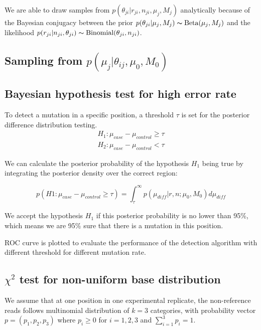 \documentclass[11pt,reqno]{amsart}
\begin{document}
We are able to draw samples from $p(\theta_{ji} | r_{ji}, n_{ji}, \mu_j, M_j)$ analytically because of the Bayesian conjugacy between the prior $p(\theta_{ji} | \mu_j, M_j) \thicksim \text{Beta}(\mu_j, M_j)$ and the likelihood $p(r_{ji} | n_{ji}, \theta_{ji}) \thicksim \text{Binomial}(\theta_{ji}, n_{ji})$. 


\subsection{Sampling from $p \left( \mu_j |\theta_{ij},\mu_0,M_0\right)$}

\subsection{Bayesian hypothesis test for high error rate}

To detect a mutation in a specific position, a threshold $\tau$ is set for the posterior difference distribution testing.
\begin{align}
 H_1: \mu_{case}-\mu_{control}\geq\tau \\
 H_2: \mu_{case}-\mu_{control}<\tau
\end{align}

We can calculate the posterior probability of the hypothesis $H_1$ being true by integrating the posterior density over the correct region:

\begin{equation}
 p(H1:\mu_{case}-\mu_{control}\geq\tau)=\int_\tau^\infty p(\mu_{diff} |r,n; \mu_0,M_0)d\mu_{diff}
\end{equation}

We accept the hypothesis $H_1$ if this posterior probability is no lower than 95\%, which means we are 95\% sure that there is a mutation in this position.

ROC curve is plotted to evaluate the performance of the detection algorithm with different threshold for different mutation rate. 


\subsection{$\chi^2$ test for non-uniform base distribution}

We assume that at one position in one experimental replicate, the non-reference reads follows multinomial distribution of $k = 3$ categories, with probability vector $p = (p_1, p_2, p_3)$ where $p_i \geq 0$ for $i =1, 2, 3$ and $\sum_{i=1}^3 p_i = 1$.
\end{document}
